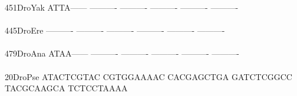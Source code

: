 \documentclass[11pt,twoside,reqno,a4paper]{article}
\begin{document}
{451\hspace*{2\charwidth}DroYak	ATTA------	----------	----------	----------	----------	----------	\\
\hspace*{5\charwidth}\hspace*{7\charwidth}\hspace*{1\charwidth}\hspace*{1\charwidth}\hspace*{1\charwidth}\hspace*{1\charwidth}\hspace*{1\charwidth}\hspace*{1\charwidth}\\
445\hspace*{2\charwidth}DroEre	----------	----------	----------	----------	----------	----------	\\
\hspace*{5\charwidth}\hspace*{7\charwidth}\hspace*{1\charwidth}\hspace*{1\charwidth}\hspace*{1\charwidth}\hspace*{1\charwidth}\hspace*{1\charwidth}\hspace*{1\charwidth}\\
479\hspace*{2\charwidth}DroAna	ATAA------	----------	----------	----------	----------	----------	\\
\hspace*{5\charwidth}\hspace*{7\charwidth}\hspace*{1\charwidth}\hspace*{1\charwidth}\hspace*{1\charwidth}\hspace*{1\charwidth}\hspace*{1\charwidth}\hspace*{1\charwidth}\\
20\hspace*{3\charwidth}DroPse	ATACTCGTAC	CGTGGAAAAC	CACGAGCTGA	GATCTCGGCC	TACGCAAGCA	TCTCCTAAAA	\\
\hspace*{5\charwidth}\hspace*{7\charwidth}\hspace*{1\charwidth}\hspace*{1\charwidth}\hspace*{1\charwidth}\hspace*{1\charwidth}\hspace*{1\charwidth}\hspace*{1\charwidth}\\
}
\end{document}
